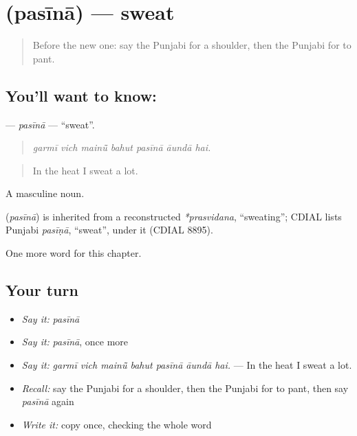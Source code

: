 \section[\texorpdfstring{\pa{ਪਸੀਨਾ} (pasīnā)}{ਪਸੀਨਾ (pasīnā)}]{ (pasīnā) — sweat}

\label{lesson:PA-C324-pasina}



\begin{quote}
Before the new one: say the Punjabi for a shoulder, then the Punjabi for to pant.
\end{quote}

\subsection*{You'll want to know: }
\textbf{} — \emph{pasīnā} — \textquotedblleft{}sweat\textquotedblright{}.

\begin{quote}
      
\end{quote}

\begin{quote}
\emph{garmī vich mainū̃ bahut pasīnā āundā hai.}
\end{quote}

\begin{quote}
In the heat I sweat a lot.
\end{quote}

A masculine noun.

\begin{cousinweb}
\textbf{} (\emph{pasīnā}) is inherited from a reconstructed \emph{*prasvidana}, \textquotedblleft{}sweating\textquotedblright{}; CDIAL lists Punjabi \emph{pasīṇā}, \textquotedblleft{}sweat\textquotedblright{}, under it (CDIAL 8895).
\end{cousinweb}

\begin{grammarlens}[title={What you've built}]
One more word for this chapter.
\end{grammarlens}

\subsection*{Your turn}
\begin{itemize}
\raggedright
  \item \emph{Say it:} \emph{pasīnā}
  \item \emph{Say it:} \emph{pasīnā}, once more
  \item \emph{Say it:} \emph{garmī vich mainū̃ bahut pasīnā āundā hai.} — In the heat I sweat a lot.
  \item \emph{Recall:} say the Punjabi for a shoulder, then the Punjabi for to pant, then say \emph{pasīnā} again
  \item \emph{Write it:} copy \textbf{} once, checking the whole word
\end{itemize}

